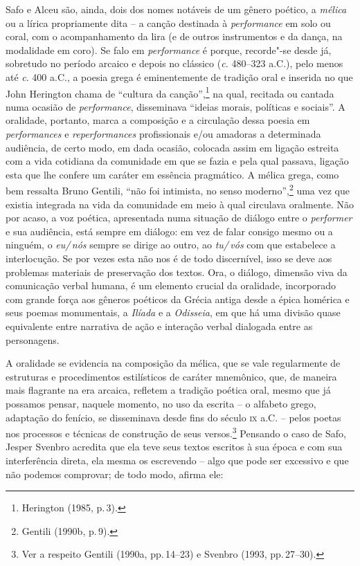 Safo e Alceu são, ainda, dois dos nomes notáveis de um gênero poético, a
\textit{mélica} ou a lírica propriamente dita -- a canção destinada à
\textit{performance} em solo ou coral,
com o acompanhamento da lira (e de outros instrumentos e da dança, na
modalidade em coro). Se falo em \textit{performance} é porque, recorde"-se
desde já, sobretudo no período arcaico e depois no clássico (\textit{c.}
480--323 a.C.), pelo menos até \textit{c}. 400 a.C., a poesia grega é eminentemente de tradição oral e inserida no
que John Herington chama de ``cultura da canção'',\footnote{ Herington (1985, p.\,3).} na
qual, recitada ou cantada numa ocasião de \textit{performance}, disseminava
“ideias morais, políticas e sociais”. A oralidade, portanto, marca
a composição e a circulação dessa poesia em \textit{performances} e
\textit{reperformances} profissionais e/ou amadoras a determinada
audiência, de certo modo, em dada ocasião, colocada assim em ligação estreita
com a vida cotidiana da comunidade em que se fazia e pela qual passava, ligação
esta que lhe confere um caráter em essência pragmático. A mélica grega,
como bem ressalta Bruno Gentili, “não foi intimista, no senso
moderno”,\footnote{ Gentili (1990b, p.\,9).} uma vez que existia integrada na
vida da comunidade em meio à qual
circulava oralmente. Não por acaso, a voz poética, apresentada numa
situação de diálogo entre o \textit{performer} e sua audiência, está sempre em
diálogo: em vez de falar consigo mesmo ou a ninguém, o \textit{eu/\,nós} sempre
se dirige ao outro, ao \textit{tu/\,vós} com que estabelece a interlocução. Se por
vezes esta não nos é de todo discernível, isso se deve aos problemas
materiais de preservação dos textos. Ora, o diálogo, dimensão viva da
comunicação verbal humana, é um elemento crucial da oralidade, incorporado com
grande força aos gêneros poéticos da Grécia antiga desde a épica homérica e
seus poemas monumentais, a \textit{Ilíada} e a \textit{Odisseia}, em que há uma
divisão quase equivalente entre narrativa de ação e interação verbal dialogada entre as personagens. 

A oralidade se evidencia na composição da mélica, que se vale regularmente de
estruturas e procedimentos estilísticos de caráter mnemônico, que,
de maneira mais flagrante na era arcaica, refletem a tradição poética oral,
mesmo que já possamos pensar, naquele momento, no uso da escrita -- o alfabeto
grego, adaptação do fenício, se disseminava desde fins do século \textsc{ix} a.C. --
pelos poetas nos processos e técnicas de construção de seus
versos.\footnote{ Ver a respeito Gentili (1990a, pp.\,14--23) e Svenbro (1993, pp.\,27--30).} Pensando o caso de Safo, Jesper Svenbro acredita
que ela teve seus textos escritos à sua época e com sua interferência direta,
ela mesma os escrevendo -- algo que pode ser excessivo e que não podemos
comprovar; de todo modo, afirma ele:

